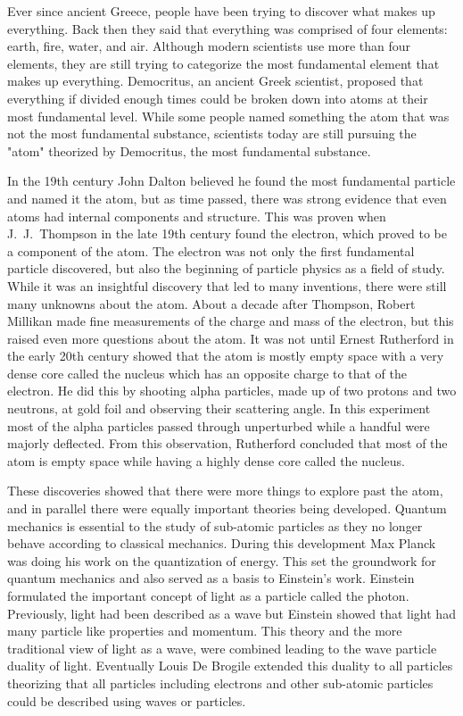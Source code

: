 Ever since ancient Greece, people have been trying to discover what makes up everything. Back then they said that everything was comprised of four elements: earth, fire, water, and air. Although modern scientists use more than four elements, they are still trying to categorize the most fundamental element that makes up everything. Democritus, an ancient Greek scientist, proposed that everything if divided enough times could be broken down into atoms at their most fundamental level. While some people named something the atom that was not the most fundamental substance, scientists today are still pursuing the "atom" theorized by Democritus, the most fundamental substance. 

In the 19th century John Dalton believed he found the most fundamental particle and named it the atom, but as time passed, there was strong evidence that even atoms had internal components and structure. This was proven when J.~J.~Thompson in the late 19th century found the electron, which proved to be a component of the atom. The electron was not only the first fundamental particle discovered, but also the beginning of particle physics as a field of study. While it was an insightful discovery that led to many inventions, there were still many unknowns about the atom. About a decade after Thompson, Robert Millikan made fine measurements of the charge and mass of the electron, but this raised even more questions about the atom. It was not until Ernest Rutherford in the early 20th century showed that the atom is mostly empty space with a very dense core called the nucleus which has an opposite charge to that of the electron. He did this by shooting alpha particles, made up of two protons and two neutrons, at gold foil and observing their scattering angle. In this experiment most of the alpha particles passed through unperturbed while a handful were majorly deflected. From this observation, Rutherford concluded that most of the atom is empty space while having a highly dense core called the nucleus. 

These discoveries showed that there were more things to explore past the atom, and in parallel there were equally important theories being developed. Quantum mechanics is essential to the study of sub-atomic particles as they no longer behave according to classical mechanics. During this development Max Planck was doing his work on the quantization of energy. This set the groundwork for quantum mechanics and also served as a basis to Einstein's work. Einstein formulated the important concept of light as a particle called the photon. Previously, light had been described as a wave but Einstein showed that light had many particle like properties and momentum. This theory and the more traditional view of light as a wave, were combined leading to the wave particle duality of light. Eventually Louis De Brogile extended this duality to all particles theorizing that all particles including electrons and other sub-atomic particles could be described using waves or particles.

